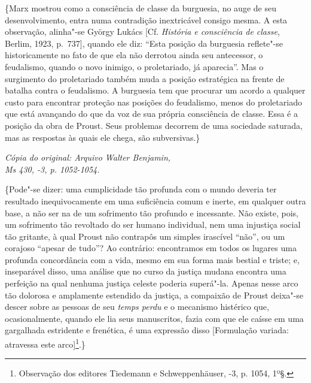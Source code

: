 \{Marx mostrou como a consciência de classe da burguesia, no auge de seu
desenvolvimento, entra numa contradição inextricável consigo mesma. A
esta observação, alinha"-se György Lukács {[}Cf. \emph{História e
consciência de classe}, Berlim, 1923, p.~737{]}, quando ele diz: ``Esta
posição da burguesia reflete"-se historicamente no fato de que ela não
derrotou ainda seu antecessor, o feudalismo, quando o novo inimigo, o
proletariado, já aparecia''. Mas o surgimento do proletariado também
muda a posição estratégica na frente de batalha contra o feudalismo. A
burguesia tem que procurar um acordo a qualquer custo para encontrar
proteção nas posições do feudalismo, menos do proletariado que está
avançando do que da voz de sua própria consciência de classe. Essa é a
posição da obra de Proust. Seus problemas decorrem de uma sociedade
saturada, mas as respostas às quais ele chega, são subversivas.\}


\begin{flushright}
\emph{\footnotesize{Cópia do original: Arquivo Walter Benjamin,\\ Ms 430, -3, p. 1052-1054.}}
\end{flushright}

\{Pode"-se dizer: uma cumplicidade tão profunda com o mundo deveria ter
resultado inequivocamente em uma suficiência comum e inerte, em qualquer
outra base, a não ser na de um sofrimento tão profundo e
incessante. Não existe, pois, um sofrimento tão revoltado do ser
humano individual, nem uma injustiça social tão gritante, à qual Proust
não contrapôs um simples irascível ``não'', ou um corajoso ``apesar de %
tudo''? Ao contrário: encontramos em todos os lugares uma profunda
concordância com a vida, mesmo em sua forma mais bestial e triste; e,
inseparável disso, uma análise que no curso da justiça
mudana encontra uma perfeição na qual nenhuma justiça celeste poderia
superá"-la. Apenas nesse arco tão dolorosa e amplamente estendido da
justiça, a compaixão de Proust deixa"-se descer sobre as pessoas de seu
\emph{temps perdu} e o mecanismo histérico que, ocasionalmente, quando
ele lia seus manuscritos, fazia com que ele caísse em uma gargalhada
estridente e frenética, é uma expressão disso {[}Formulação variada:
atravessa este arco{]}\footnote{Observação dos editores Tiedemann e
  Schweppenhäuser, -3, p. 1054, 1º§. \versal{[N. T.]}}.\}

